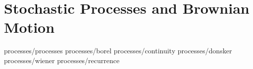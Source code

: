 \chapter	{Stochastic Processes and Brownian Motion}

	{processes/processes}
	{processes/borel}
	{processes/continuity}
	{processes/donsker}
	{processes/wiener}
	{processes/recurrence}
